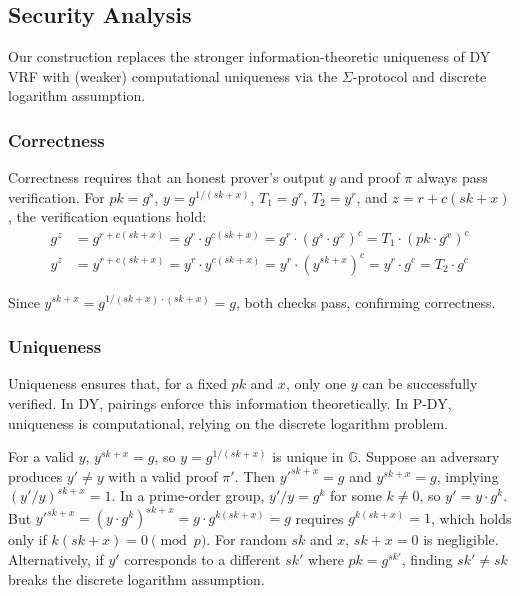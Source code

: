 \subsection{Security Analysis}

Our construction replaces the stronger information-theoretic uniqueness of DY VRF with (weaker) computational uniqueness via the $\Sigma$-protocol and discrete logarithm assumption.


\subsubsection{Correctness}

Correctness requires that an honest prover’s output $y$ and proof $\pi$ always pass verification. For $pk = g^{s}$, $y = g^{1/(sk + x)}$, $T_1 = g^r$, $T_2 = y^r$, and $z = r + c(sk + x)$, the verification equations hold:
\begin{align*}
g^z &= g^{r + c(sk + x)} = g^r \cdot g^{c(sk + x)} = g^r \cdot (g^{s} \cdot g^x)^c = T_1 \cdot (pk \cdot g^x)^c \\
y^z &= y^{r + c(sk + x)} = y^r \cdot y^{c(sk + x)} = y^r \cdot (y^{sk + x})^c = y^r \cdot g^c = T_2 \cdot g^c
\end{align*}

Since $y^{sk + x} = g^{1/(sk + x) \cdot (sk + x)} = g$, both checks pass, confirming correctness.

\subsubsection{Uniqueness}

Uniqueness ensures that, for a fixed $pk$ and $x$, only one $y$ can be successfully verified. In DY, pairings enforce this information theoretically. In P-DY, uniqueness is computational, relying on the discrete logarithm problem.

For a valid $y$, $y^{sk + x} = g$, so $y = g^{1/(sk + x)}$ is unique in $\mathbb{G}$. Suppose an adversary produces $y' \neq y$ with a valid proof $\pi'$. Then $y'^{sk + x} = g$ and $y^{sk + x} = g$, implying $(y'/y)^{sk + x} = 1$. In a prime-order group, $y'/y = g^k$ for some $k \neq 0$, so $y' = y \cdot g^k$. But $y'^{sk + x} = (y \cdot g^k)^{sk + x} = g \cdot g^{k(sk + x)} = g$ requires $g^{k(sk + x)} = 1$, which holds only if $k(sk + x) = 0 \pmod{p}$. For random $sk$ and $x$, $sk + x = 0$ is negligible. Alternatively, if $y'$ corresponds to a different $sk'$ where $pk = g^{sk'}$, finding $sk' \neq sk$ breaks the discrete logarithm assumption.

